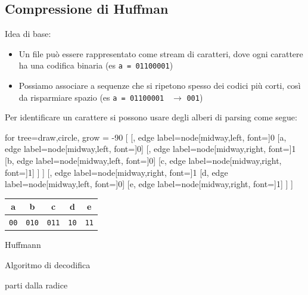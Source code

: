 \subsection{Compressione di Huffman}
Idea di base:
\begin{itemize}
	\item Un file può essere rappresentato come stream di caratteri, dove ogni carattere ha una codifica binaria (es \verb|a = 01100001|)
	\item Possiamo associare a sequenze che si ripetono spesso dei codici più corti, così da risparmiare spazio (es \verb|a = 01100001 | $ \rightarrow  $ \verb|001|)
\end{itemize}
Per identificare un carattere si possono usare degli alberi di parsing come segue:
\vskip3mm
\begin{minipage}[c]{0.48\textwidth}
	\begin{center}
		\begin{forest}
			for tree={draw,circle, grow = -90}
			[
			[, edge label={node[midway,left, font=\tiny]{0}}
						[a, edge label={node[midway,left, font=\tiny]{0}}]
						[, edge label={node[midway,right, font=\tiny]{1}}
								[b, edge label={node[midway,left, font=\tiny]{0}}]
								[c, edge label={node[midway,right, font=\tiny]{1}}]
						]
				]
				[, edge label={node[midway,right, font=\tiny]{1}}
						[d, edge label={node[midway,left, font=\tiny]{0}}]
						[e, edge label={node[midway,right, font=\tiny]{1}}]
				]
			]
		\end{forest}
		\vskip3mm
		\begin{tabular}{ccccc}
			\toprule
			a           & b            & c            & d           & e           \\
			\midrule
			\texttt{00} & \texttt{010} & \texttt{011} & \texttt{10} & \texttt{11} \\
			\bottomrule
		\end{tabular}
	\end{center}
\end{minipage}%
\hfill
\begin{minipage}[c]{0.48\textwidth}
	\begin{algoritmo}{Huffmann}
		\begin{algorithm}[H]
			\caption{Algoritmo di decodifica}
			parti dalla radice\;
		\end{algorithm}
	\end{algoritmo}
\end{minipage}
